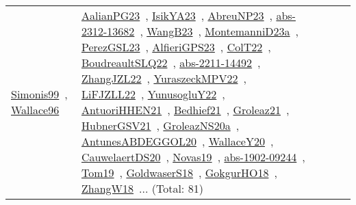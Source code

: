 {\begin{longtable}{lp{3cm}>{\raggedright\arraybackslash}p{6cm}>{\raggedright\arraybackslash}p{6cm}>{\raggedright\arraybackslash}p{8cm}}
\href{works/Simonis99.pdf}{Simonis99}~\cite{Simonis99}, \href{works/Wallace96.pdf}{Wallace96}~\cite{Wallace96} & \href{works/AalianPG23.pdf}{AalianPG23}~\cite{AalianPG23}, \href{works/IsikYA23.pdf}{IsikYA23}~\cite{IsikYA23}, \href{works/AbreuNP23.pdf}{AbreuNP23}~\cite{AbreuNP23}, \href{works/abs-2312-13682.pdf}{abs-2312-13682}~\cite{abs-2312-13682}, \href{works/WangB23.pdf}{WangB23}~\cite{WangB23}, \href{works/MontemanniD23a.pdf}{MontemanniD23a}~\cite{MontemanniD23a}, \href{works/PerezGSL23.pdf}{PerezGSL23}~\cite{PerezGSL23}, \href{works/AlfieriGPS23.pdf}{AlfieriGPS23}~\cite{AlfieriGPS23}, \href{works/ColT22.pdf}{ColT22}~\cite{ColT22}, \href{works/BoudreaultSLQ22.pdf}{BoudreaultSLQ22}~\cite{BoudreaultSLQ22}, \href{works/abs-2211-14492.pdf}{abs-2211-14492}~\cite{abs-2211-14492}, \href{works/ZhangJZL22.pdf}{ZhangJZL22}~\cite{ZhangJZL22}, \href{works/YuraszeckMPV22.pdf}{YuraszeckMPV22}~\cite{YuraszeckMPV22}, \href{works/LiFJZLL22.pdf}{LiFJZLL22}~\cite{LiFJZLL22}, \href{works/YunusogluY22.pdf}{YunusogluY22}~\cite{YunusogluY22}, \href{works/AntuoriHHEN21.pdf}{AntuoriHHEN21}~\cite{AntuoriHHEN21}, \href{works/Bedhief21.pdf}{Bedhief21}~\cite{Bedhief21}, \href{works/Groleaz21.pdf}{Groleaz21}~\cite{Groleaz21}, \href{works/HubnerGSV21.pdf}{HubnerGSV21}~\cite{HubnerGSV21}, \href{works/GroleazNS20a.pdf}{GroleazNS20a}~\cite{GroleazNS20a}, \href{works/AntunesABDEGGOL20.pdf}{AntunesABDEGGOL20}~\cite{AntunesABDEGGOL20}, \href{works/WallaceY20.pdf}{WallaceY20}~\cite{WallaceY20}, \href{works/CauwelaertDS20.pdf}{CauwelaertDS20}~\cite{CauwelaertDS20}, \href{works/Novas19.pdf}{Novas19}~\cite{Novas19}, \href{works/abs-1902-09244.pdf}{abs-1902-09244}~\cite{abs-1902-09244}, \href{works/Tom19.pdf}{Tom19}~\cite{Tom19}, \href{works/GoldwaserS18.pdf}{GoldwaserS18}~\cite{GoldwaserS18}, \href{works/GokgurHO18.pdf}{GokgurHO18}~\cite{GokgurHO18}, \href{works/ZhangW18.pdf}{ZhangW18}~\cite{ZhangW18}... (Total: 81)\\
\end{longtable}
}

